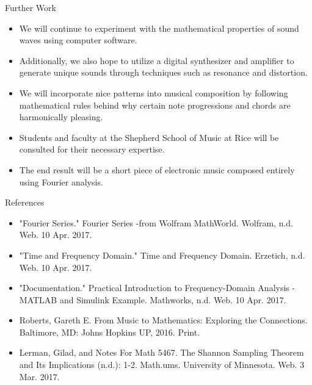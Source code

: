 \documentclass[leqno,presentation]{beamer}
\theoremstyle{definition}
\begin{document}
\begin{frame}
\begin{columns}[t]
\begin{column}{.25\linewidth}
\begin{block}{Further Work}
\vspace{1ex}
\begin{itemize}
\item We will continue to experiment with the mathematical properties of sound waves using computer software.
\item Additionally, we also hope to utilize a digital synthesizer and amplifier to generate unique sounds through techniques such as resonance and distortion.
\item We will incorporate nice patterns into musical composition by following mathematical rules behind why certain note progressions and chords are harmonically pleasing. 
\item Students and faculty at the Shepherd School of Music at Rice will be consulted for their necessary expertise. 
\item The end result will be a short piece of electronic music composed entirely using Fourier analysis.
\end{itemize}
\end{block}

\begin{block}{References}
\vspace{1ex}
\begin{itemize}
\item"Fourier Series." Fourier Series -from Wolfram MathWorld. Wolfram, n.d. Web. 10 Apr. 2017.
\item"Time and Frequency Domain." Time and Frequency Domain. Erzetich, n.d. Web. 10 Apr. 2017.
\item"Documentation." Practical Introduction to Frequency-Domain Analysis - MATLAB and Simulink Example. Mathworks, n.d. Web. 10 Apr. 2017.
\item Roberts, Gareth E. From Music to Mathematics: Exploring the Connections. Baltimore, MD: Johns Hopkins UP, 2016. Print.
\item Lerman, Gilad, and Notes For Math 5467. The Shannon Sampling Theorem and Its Implications (n.d.): 1-2. Math.ums. University of Minnesota. Web. 3 Mar. 2017.
\end{itemize}
\end{block}


\end{column}
\end{columns}
\end{frame}
\end{document}
